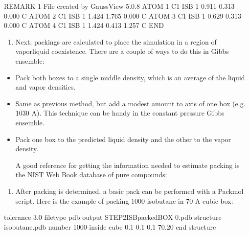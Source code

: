 \documentclass[letterpaper,10pt,english]{sphinxmanual}
\begin{document}
\begin{sphinxVerbatim}[commandchars=\\\{\}]
REMARK   1 File created by GaussView 5.0.8
ATOM     1  C1   ISB  1   0.911  \PYGZhy{}0.313    0.000  C
ATOM     2  C1   ISB  1   1.424  \PYGZhy{}1.765    0.000  C
ATOM     3  C1   ISB  1  \PYGZhy{}0.629  \PYGZhy{}0.313    0.000  C
ATOM     4  C1   ISB  1   1.424   0.413   \PYGZhy{}1.257  C
END
\end{sphinxVerbatim}
\begin{enumerate}
%
\setcounter{enumi}{1}
\item {} 
\sphinxAtStartPar
Next, packings are calculated to place the simulation in a region of vapor\sphinxhyphen{}liquid coexistence. There are a couple of ways to do this in Gibbs ensemble:

\end{enumerate}
\begin{itemize}
\item {} 
\sphinxAtStartPar
Pack both boxes to a single middle density, which is an average of the liquid and vapor densities.

\item {} 
\sphinxAtStartPar
Same as previous method, but add a modest amount to axis of one box (e.g. 10\sphinxhyphen{}30 A). This technique can be handy in the constant pressure Gibbs ensemble.

\item {} 
\sphinxAtStartPar
Pack one box to the predicted liquid density and the other to the vapor density.

\sphinxAtStartPar
A good reference for getting the information needed to estimate packing is the NIST Web Book database of pure compounds:

\sphinxAtStartPar
{}

\end{itemize}
\begin{enumerate}
%
\setcounter{enumi}{2}
\item {} 
\sphinxAtStartPar
After packing is determined, a basic pack can be performed with a Packmol script. Here is the example of packing 1000 isobutane in 70 A cubic box:

\end{enumerate}

\begin{sphinxVerbatim}[commandchars=\\\{\}]
tolerance   3.0
filetype    pdb
output      STEP2\PYGZus{}ISB\PYGZus{}packed\PYGZus{}BOX 0.pdb
structure   isobutane.pdb
number      1000
inside cube 0.1   0.1   0.1   70.20
end     structure
\end{sphinxVerbatim}
\end{document}
